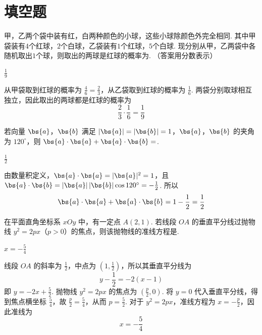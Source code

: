\section{填空题}

\begin{problem}
甲，乙两个袋中装有红，白两种颜色的小球，这些小球除颜色外完全相同. 其中甲袋装有\(4\)个红球，\(2\)个白球，乙袋装有\(1\)个红球，\(5\)个白球. 现分别从甲，乙两袋中各随机取出\(1\)个球，则取出的两球是红球的概率为\fillinblank{}. （答案用分数表示）
\end{problem}

\begin{answer}
\(\frac{1}{9}\)
\end{answer}

\begin{solution}
从甲袋取到红球的概率为 \(\frac{4}{6}=\frac23\)，从乙袋取到红球的概率为 \(\frac{1}{6}\). 两袋分别取球相互独立，因此取出的两球都是红球的概率为
\[
\frac23\cdot\frac16=\frac19
\]
\end{solution}

\begin{problem}
若向量 \(\bs{a}\)，\(\bs{b}\) 满足 \(|\bs{a}| = |\bs{b}| = 1\)，\(\bs{a}\)，\(\bs{b}\) 的夹角为 \(120^{\circ}\)，则 \(\bs{a} \cdot \bs{a} + \bs{a} \cdot \bs{b} = \)\fillinblank{}.
\end{problem}

\begin{answer}
\(\frac{1}{2}\)
\end{answer}

\begin{solution}
由数量积定义，\(\bs{a}\cdot\bs{a}=|\bs{a}|^2=1\)，且 \(\bs{a}\cdot\bs{b}=|\bs{a}|\,|\bs{b}|\cos120^{\circ}=-\frac12\).
所以
\[
\bs{a}\cdot\bs{a}+\bs{a}\cdot\bs{b}=1-\frac12=\frac12
\]
\end{solution}

\begin{problem}
在平面直角坐标系 \(xOy\) 中，有一定点 \(A(2,1)\). 若线段 \(OA\) 的垂直平分线过抛物线 \(y^{2} = 2px\)（\(p > 0\)）的焦点，则该抛物线的准线方程是\fillinblank{}.
\end{problem}

\begin{answer}
\(x=-\frac{5}{4}\)
\end{answer}

\begin{solution}
线段 \(OA\) 的斜率为 \(\frac12\)，中点为 \((1,\frac12)\)，所以其垂直平分线为
\[
y-\frac12=-2(x-1)
\]
即 \(y=-2x+\frac52\). 抛物线 \(y^2=2px\) 的焦点为 \((\frac p2,0)\). 将 \(y=0\) 代入垂直平分线，得到焦点横坐标 \(\frac54\)，故 \(\frac p2=\frac54\)，从而 \(p=\frac52\). 对于 \(y^2=2px\)，准线方程为 \(x=-\frac p2\)，因此准线为
\[
x=-\frac54
\]
\end{solution}

